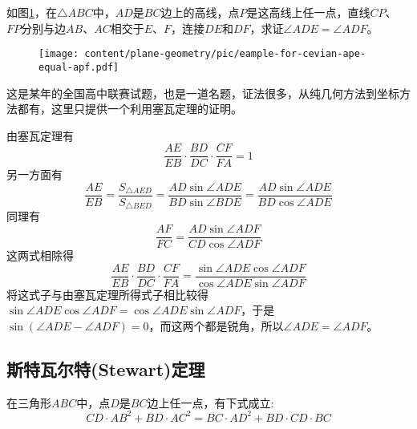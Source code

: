 \begin{example}
 如图\ref{fig:eample-for-cevian-ape-equal-apf}，在$\triangle ABC$中，$AD$是$BC$边上的高线，点$P$是这高线上任一点，直线$CP$、$FP$分别与边$AB$、$AC$相交于$E$、$F$，连接$DE$和$DF$，求证$\angle ADE = \angle ADF$。

\begin{figure}[htbp]
\centering
\texttt{[image: content/plane-geometry/pic/eample-for-cevian-ape-equal-apf.pdf]}
\caption{}
\label{fig:eample-for-cevian-ape-equal-apf}
\end{figure}

这是某年的全国高中联赛试题，也是一道名题，证法很多，从纯几何方法到坐标方法都有，这里只提供一个利用塞瓦定理的证明。

由塞瓦定理有
\begin{equation*}
  \frac{AE}{EB} \cdot \frac{BD}{DC} \cdot \frac{CF}{FA} = 1
\end{equation*}
另一方面有
\begin{equation*}
  \frac{AE}{EB} = \frac{S_{\triangle AED}}{S_{\triangle BED}} = \frac{AD \sin{\angle ADE}}{BD \sin{\angle BDE}} = \frac{AD \sin{\angle ADE}}{BD \cos{\angle ADE}}
\end{equation*}
同理有
\begin{equation*}
  \frac{AF}{FC} = \frac{AD \sin{\angle ADF}}{CD \cos{\angle ADF}}
\end{equation*}
这两式相除得
\begin{equation*}
  \frac{AE}{EB} \cdot \frac{BD}{DC} \cdot \frac{CF}{FA} = \frac{\sin{\angle ADE} \cos{\angle ADF}}{\cos{\angle ADE} \sin{\angle ADF}} 
\end{equation*}
将这式子与由塞瓦定理所得式子相比较得$\sin{\angle ADE} \cos{\angle ADF} = \cos{\angle ADE} \sin{\angle ADF}$，于是$\sin{(\angle ADE - \angle ADF)} = 0$，而这两个都是锐角，所以$\angle ADE = \angle ADF$。
\end{example}

\subsection{斯特瓦尔特(Stewart)定理}
\label{sec:stewart-theorem}

\begin{theorem}[斯特瓦尔特定理]
  在三角形$ABC$中，点$D$是$BC$边上任一点，有下式成立:
  \begin{equation}
    \label{eq:stewart-theorem}
    CD \cdot AB^2 + BD \cdot AC^2 = BC \cdot AD^2 + BD \cdot CD \cdot BC
  \end{equation}
\end{theorem}

